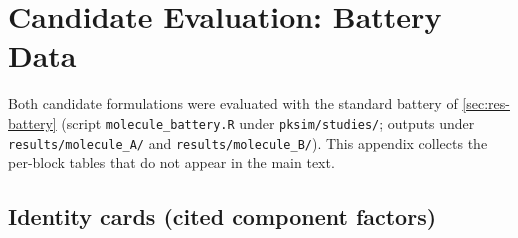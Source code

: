 \chapter{Candidate Evaluation: Battery Data}
\label{chap:app-battery}

Both candidate formulations were evaluated with the standard battery of \cref{sec:res-battery} (script \texttt{molecule\_battery.R} under \texttt{pksim/studies/}; outputs under \texttt{results/molecule\_A/} and \texttt{results/molecule\_B/}). This appendix collects the per-block tables that do not appear in the main text.

\section{Identity cards (cited component factors)}

\begin{table}[htbp]
\centering
\caption{Component factors at the candidate compositions (decoded via the shared enhancement model).}
\label{tab:app-identity}
\end{table}

